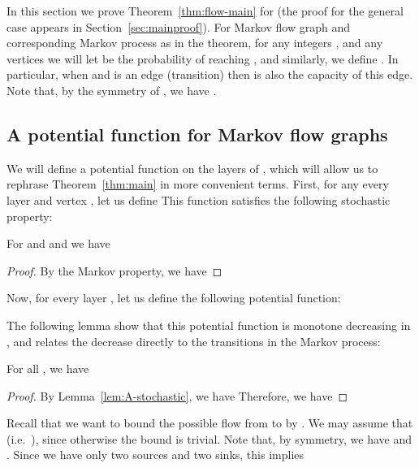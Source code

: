 In this section we prove Theorem~\ref{thm:flow-main} for  (the proof for the general case appears in Section~\ref{sec:mainproof}). For Markov flow graph  and corresponding Markov process  as in the theorem, for any integers , and any vertices  we will let  be the probability of reaching , and similarly, we define . In particular, when  and  is an edge (transition) then  is also the capacity of this edge. Note that, by the symmetry of , we have .

\subsection{A potential function for Markov flow graphs}

\iffalse
In this section is a symmetric Markov flow graph, representing a Markov process  with  and , and  for . Each layer has at most  vertices. Each vertex  has probability  of being reached in the Markov flow starting from , and each transition  has probability  of being traversed (i.e.\ capacity). We extend this notation and write, for any vertices , where , .
\fi

We will define  a potential function on the layers of , which will allow us to rephrase Theorem~\ref{thm:main} in more convenient terms. First, for any every layer  and vertex , let us define 
This function satisfies the following stochastic property:

\begin{lemma}\label{lem:A-stochastic} For and  and  we have 
\end{lemma}
\ifprocs\else
\begin{proof} By the Markov property, we have

\end{proof}
\fi

Now, for every layer , let us define the following potential function:

The following lemma show that this potential function is monotone decreasing in , and relates the decrease directly to the transitions in the Markov process:

\begin{lemma}\label{lem:potential} For all , we have
\ifprocs 
\else 
\fi
\end{lemma}
\ifprocs\else
\begin{proof}
By Lemma~\ref{lem:A-stochastic}, we have 
Therefore, we have

\end{proof}
\fi

Recall that we want to bound the possible flow from  to  by .  We may assume that   (i.e.\ ), since otherwise the bound is trivial. Note that, by symmetry, we have  and . Since we have only two sources and two sinks, this implies


